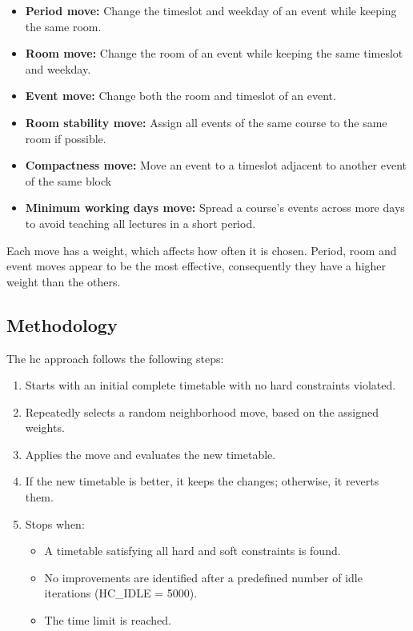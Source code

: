 \begin{itemize}
\item \textbf{Period move:} Change the timeslot and weekday of an event while keeping the same room.
\item \textbf{Room move:} Change the room of an event while keeping the same timeslot and weekday.
\item \textbf{Event move:} Change both the room and timeslot of an event.
\item \textbf{Room stability move:} Assign all events of the same course to the same room if possible.
\item \textbf{Compactness move:} Move an event to a timeslot adjacent to another event of the same block
\item \textbf{Minimum working days move:} Spread a course's events across more days to avoid teaching all lectures in a short period.
\end{itemize}

Each move has a weight, which affects how often it is chosen. Period, room and event moves appear to be the most effective, consequently they have a higher weight than the others.

\subsection{Methodology}

The \ac{hc} approach follows the following steps:

\begin{enumerate}
\item Starts with an initial complete timetable with no hard constraints violated.
\item Repeatedly selects a random neighborhood move, based on the assigned weights.
\item Applies the move and evaluates the new timetable.
\item If the new timetable is better, it keeps the changes; otherwise, it reverts them.
\item Stops when:
	\begin{itemize}
	\item A timetable satisfying all hard and soft constraints is found.
	\item No improvements are identified after a predefined number of idle iterations (HC\_IDLE = 5000).
	\item The time limit is reached.
	\end{itemize}
\end{enumerate}


